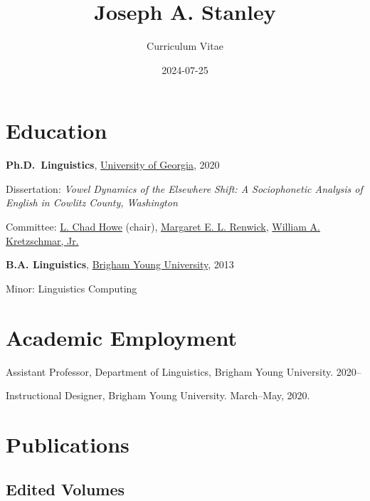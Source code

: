 \documentclass[
]{article}
\title{Joseph A. Stanley}
\subtitle{Curriculum Vitae}
\author{}
\date{2024-07-25}
\begin{document}
\maketitle
\ifdefined\Shaded\renewenvironment{Shaded}{\begin{tcolorbox}[boxrule=0pt, sharp corners, interior hidden, borderline west={3pt}{0pt}{shadecolor}, frame hidden, breakable, enhanced]}{\end{tcolorbox}}\fi

\hypertarget{education}{%
\section{Education}\label{education}}

\textbf{Ph.D.~Linguistics},
\href{http://www.linguistics.uga.edu/}{University of Georgia}, 2020

Dissertation: \emph{Vowel Dynamics of the Elsewhere Shift: A
Sociophonetic Analysis of English in Cowlitz County, Washington}

Committee: \href{https://chadhoweuga.github.io}{L. Chad Howe} (chair),
\href{https://linguistics.uga.edu/directory/people/margaret-e-l-renwick/}{Margaret
E. L. Renwick},
\href{https://www.english.uga.edu/directory/people/william-kretzschmar}{William
A. Kretzschmar, Jr.}

\textbf{B.A. Linguistics}, \href{http://ling.byu.edu/}{Brigham Young
University}, 2013

Minor: Linguistics Computing

\hypertarget{academic-employment}{%
\section{Academic Employment}\label{academic-employment}}

Assistant Professor, Department of Linguistics, Brigham Young
University. 2020--

Instructional Designer, Brigham Young University. March--May, 2020.

\hypertarget{publications}{%
\section{Publications}\label{publications}}

\hypertarget{edited-volumes}{%
\subsection{Edited Volumes}\label{edited-volumes}}
\end{document}
